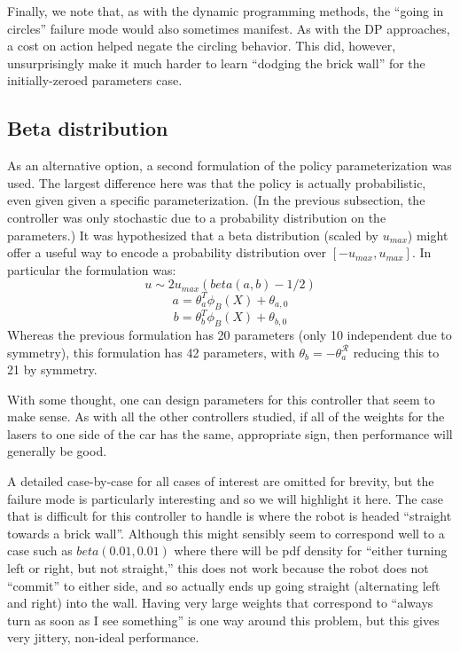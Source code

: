 \documentclass{article}
\begin{document}
Finally, we note that, as with the dynamic programming methods, the ``going in circles'' failure mode would also sometimes manifest.  As with the DP approaches, a cost on action helped negate the circling behavior.  This did, however, unsurprisingly make it much harder to learn ``dodging the brick wall'' for the initially-zeroed parameters case.

\subsection{Beta distribution}

As an alternative option, a second formulation of the policy parameterization was used.  The largest difference here was that the policy is actually probabilistic, even given given a specific parameterization.  (In the previous subsection, the controller was only stochastic due to a probability distribution on the parameters.)  It was hypothesized that a beta distribution (scaled by $u_{max}$) might offer a useful way to encode a probability distribution over $[-u_{max}, u_{max}]$.  In particular the formulation was:
%
%
\begin{equation}
u \sim 2u_{max}(beta(a,b) - 1/2)
\end{equation}
\begin{equation}
a = \theta_a^T \phi_B(X) + \theta_{a, 0}
\end{equation}
\begin{equation}
b = \theta_b^T \phi_B(X) + \theta_{b, 0}
\end{equation}
%
%
Whereas the previous formulation has 20 parameters (only 10 independent due to symmetry), this formulation has 42 parameters, with $\theta_b = -\theta_a^{\mathcal{R}}$ reducing this to 21 by symmetry.

With some thought, one can design parameters for this controller that seem to make sense.  As with all the other controllers studied, if all of the weights for the lasers to one side of the car has the same, appropriate sign, then performance will generally be good.  

A detailed case-by-case for all cases of interest are omitted for brevity, but the failure mode is particularly interesting and so we will highlight it here.  The case that is difficult for this controller to handle is where the robot is headed ``straight towards a brick wall''.  Although this might sensibly seem to correspond well to a case such as $beta(0.01, 0.01)$ where there will be pdf density for ``either turning left or right, but not straight,'' this does not work because the robot does not ``commit'' to either side, and so actually ends up going straight (alternating left and right) into the wall.  Having very large weights that correspond to ``always turn as soon as I see something'' is one way around this problem, but this gives very jittery, non-ideal performance.
\end{document}
